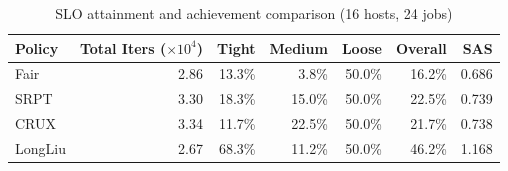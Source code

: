 \begin{table}[t]
\centering
\caption{SLO attainment and achievement comparison (16 hosts, 24 jobs)}
\label{tab:slo_16host}
\begin{tabular}{l|r|r|r|r|r|r}
\hline
Policy & Total Iters ($\times 10^4$) & Tight & Medium & Loose & Overall & SAS \\
\hline
Fair & 2.86 & 13.3\% & 3.8\% & 50.0\% & 16.2\% & 0.686 \\
SRPT & 3.30 & 18.3\% & 15.0\% & 50.0\% & 22.5\% & 0.739 \\
CRUX & 3.34 & 11.7\% & 22.5\% & 50.0\% & 21.7\% & 0.738 \\
LongLiu & 2.67 & 68.3\% & 11.2\% & 50.0\% & 46.2\% & 1.168 \\
\hline
\end{tabular}
\end{table}
